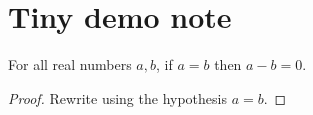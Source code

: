 \section{Tiny demo note}

\begin{theorem}
For all real numbers $a,b$, if $a=b$ then $a-b=0$.
\end{theorem}
\begin{proof}
Rewrite using the hypothesis $a=b$.
\end{proof}